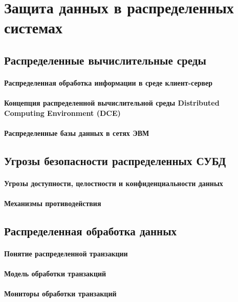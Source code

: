 \section{Защита данных в распределенных системах}
\subsection{Распределенные вычислительные среды}
\paragraph{Распределенная обработка информации в среде клиент-сервер}
\paragraph{Концепция распределенной вычислительной среды Distributed Computing Environment (DCE)}
\paragraph{Распределенные базы данных в сетях ЭВМ}

\subsection{Угрозы безопасности распределенных СУБД}
\paragraph{Угрозы доступности, целостности и конфиденциальности данных}
\paragraph{Механизмы противодействия}

\subsection{Распределенная обработка данных}
\paragraph{Понятие распределенной транзакции}
\paragraph{Модель обработки транзакций}
\paragraph{Мониторы обработки транзакций}
